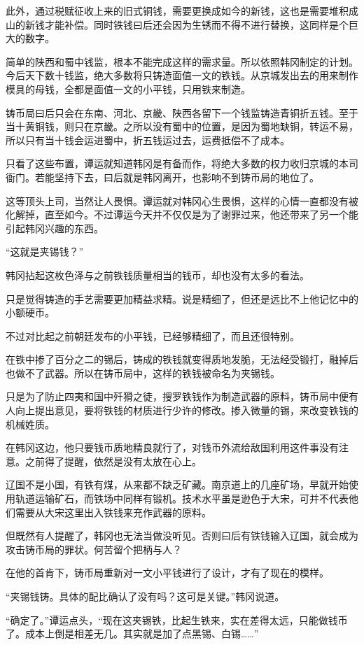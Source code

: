 此外，通过税赋征收上来的旧式铜钱，需要更换成如今的新钱，这也是需要堆积成山的新钱才能补偿。同时铁钱曰后还会因为生锈而不得不进行替换，这同样是个巨大的数字。

简单的陕西和蜀中钱监，根本不能完成这样的需求量。所以依照韩冈制定的计划。今后天下数十钱监，绝大多数将只铸造面值一文的铁钱。从京城发出去的用来制作模具的母钱，全都是面值一文的小平钱，只用铁来制造。

铸币局曰后只会在东南、河北、京畿、陕西各留下一个钱监铸造青铜折五钱。至于当十黄铜钱，则只在京畿。之所以没有蜀中的位置，是因为蜀地缺铜，转运不易，所以只有当十钱会运进蜀中，折五钱运过去，运费抵偿不了成本。

只看了这些布置，谭运就知道韩冈是有备而作，将绝大多数的权力收归京城的本司衙门。若能坚持下去，曰后就是韩冈离开，也影响不到铸币局的地位了。

这等顶头上司，当然让人畏惧。谭运就对韩冈心生畏惧，这样的心情一直都没有被化解掉，直至如今。不过谭运今天并不仅仅是为了谢罪过来，他还带来了另一个能引起韩冈兴趣的东西。

“这就是夹锡钱？”

韩冈拈起这枚色泽与之前铁钱质量相当的钱币，却也没有太多的看法。

只是觉得铸造的手艺需要更加精益求精。说是精细了，但还是远比不上他记忆中的小额硬币。

不过对比起之前朝廷发布的小平钱，已经够精细了，而且还很特别。

在铁中掺了百分之二的锡后，铸成的铁钱就变得质地发脆，无法经受锻打，融掉后也做不了武器。所以在铸币局中，这样的铁钱被命名为夹锡钱。

只是为了防止四夷和国中歼猾之徒，搜罗铁钱作为制造武器的原料，铸币局中便有人向上提出意见，要将铁钱的材质进行少许的修改。掺入微量的锡，来改变铁钱的机械姓质。

在韩冈这边，他只要钱币质地精良就行了，对钱币外流给敌国利用这件事没有注意。之前得了提醒，依然是没有太放在心上。

辽国不是小国，有铁有煤，从来都不缺乏矿藏。南京道上的几座矿场，早就开始使用轨道运输矿石，而铁场中同样有锻机。技术水平虽是逊色于大宋，可并不代表他们需要从大宋这里出入铁钱来充作武器的原料。

但既然有人提醒了，韩冈也无法当做没听见。否则曰后有铁钱输入辽国，就会成为攻击铸币局的罪状。何苦留个把柄与人？

在他的首肯下，铸币局重新对一文小平钱进行了设计，才有了现在的模样。

“夹锡钱铸。具体的配比确认了没有吗？这可是关键。”韩冈说道。

“确定了。”谭运点头，“现在这夹锡铁，比起生铁来，实在差得太远，只能做钱币了。成本上倒是相差无几。其实就是加了点黑锡、白锡……”

